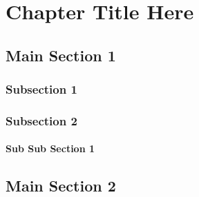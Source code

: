 \chapter{Chapter Title Here} \label{ChapterX}

\section{Main Section 1}

  \lipsum[3]

  \subsection{Subsection 1}

    \lipsum[1]


  \subsection{Subsection 2}

    \lipsum[1]

      \subsubsection{Sub Sub Section 1}

        \lipsum[1]

\section{Main Section 2}

  \lipsum[1]


